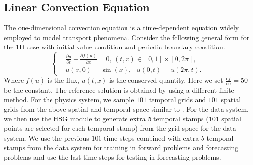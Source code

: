 \documentclass[preprint,11pt]{elsarticle}
\begin{document}
\subsection{Linear Convection Equation}
The one-dimensional convection equation is a time-dependent equation widely employed to model transport phenomena. Consider the following general form for the 1D case with initial value condition and periodic boundary condition: 
\begin{equation}\left\{
\begin{aligned}
&\frac{\partial u}{\partial t} + \frac{\partial f(u)}{\partial x} = 0 ,\, (t,x)\in[0,1]\times [0,2\pi],\\
& u(x,0)=\sin(x), \:\:\:  u(0,t)=u(2\pi,t).
\end{aligned} \right.  
\end{equation}
Where $f(u)$ is the flux, $u(t,x)$ is the conserved quantity. Here we set 
$\frac{\mathrm{d} f}{\mathrm{d} u}=50$ be the constant. 
The reference solution is obtained by using a different finite method. For the physics system, we sample $101$ temporal grids and $101$ spatial grids from the above spatial and temporal space similar to \cite{zhao2023pinnsformer}. For the data system, we then use the HSG module to generate extra $5$ temporal stamps (101 spatial points are selected for each temporal stamp) from the grid space for the data system. We use the previous $100$ time steps combined with extra $5$ temporal stamps from the data system for training in forward problems and forecasting problems and use the last time steps for testing in forecasting problems.
\end{document}
